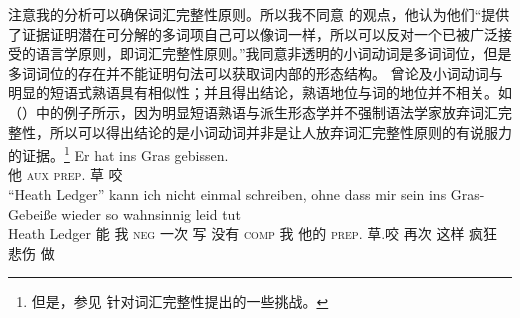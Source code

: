 \begin{exe}
\begin{xlist}[iv.]
\begin{exe}
\begin{xlist}[iv.]
注意我的分析可以确保词汇完整性原则。所以我不同意 \citet*[]{CSP2010a}的观点，他认为他们“提供了证据证明潜在可分解的多词项自己可以像词一样，所以可以反对一个已被广泛接受的语言学原则，即词汇完整性原则。”我同意非透明的小词动词是多词词位，但是多词词位的存在并不能证明句法可以获取词内部的形态结构。 曾论及小词动词与明显的短语式熟语具有相似性；并且得出结论，熟语地位与词的地位并不相关。如（）中的例子所示，因为明显短语熟语与派生形态学并不强制语法学家放弃词汇完整性，所以可以得出结论的是小词动词并非是让人放弃词汇完整性原则的有说服力的证据。\footnote{%
  但是，参见 针对词汇完整性提出的一些挑战。
}
\eal
\ex
\gll Er hat ins Gras gebissen.\\
     他 \textsc{aux} \textsc{prep}. 草 咬\\
\ex 
\gll "`Heath Ledger"' kann ich nicht einmal schreiben, ohne dass mir sein ins Gras-Gebeiße wieder so
wahnsinnig leid tut%
\footnotemark\\
    \spacebr{}Heath Ledger 能 我 \textsc{neg} 一次 写 没有 \textsc{comp} 我 他的 \textsc{prep}. 草.咬 再次 这样
    疯狂 悲伤 做\\
\end{xlist}
\end{exe}
\end{xlist}
\end{exe}
